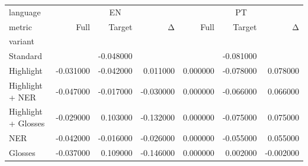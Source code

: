 \begin{tabular}{lrrrrrr}
\toprule
language & \multicolumn{3}{c}{EN} & \multicolumn{3}{c}{PT} \\
metric & Full & Target & Δ & Full & Target & Δ \\
variant &  &  &  &  &  &  \\
\midrule
Standard &  & -0.048000 &  &  & -0.081000 &  \\
Highlight & -0.031000 & -0.042000 & 0.011000 & 0.000000 & -0.078000 & 0.078000 \\
Highlight + NER & -0.047000 & -0.017000 & -0.030000 & 0.000000 & -0.066000 & 0.066000 \\
Highlight + Glosses & -0.029000 & 0.103000 & -0.132000 & 0.000000 & -0.075000 & 0.075000 \\
NER & -0.042000 & -0.016000 & -0.026000 & 0.000000 & -0.055000 & 0.055000 \\
Glosses & -0.037000 & 0.109000 & -0.146000 & 0.000000 & 0.002000 & -0.002000 \\
\bottomrule
\end{tabular}
